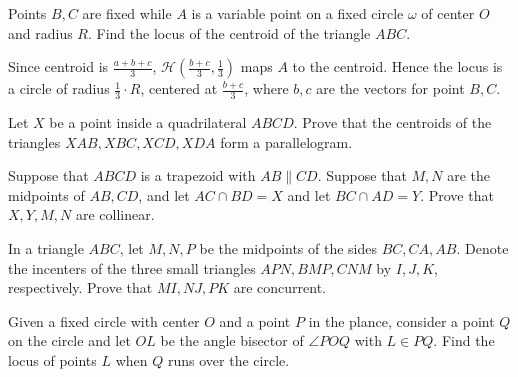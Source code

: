 \documentclass[11pt,twoside]{scrartcl}
\begin{document}
\begin{problem}
    Points $B, C$ are fixed while $A$ is a variable point on a fixed circle $\omega$ of center $O$ and radius $R$. Find the locus of the centroid of the triangle $ABC$.
    \begin{sketch}
        Since centroid is $\frac{a+b+c}{3}$, $\mathcal{H}(\frac{b+c}{3}, \frac{1}{3})$ maps $A$ to the centroid. Hence the locus is a circle of radius $\frac{1}{3}\cdot R$, centered at $\frac{b+c}{3}$, where $b, c$ are the vectors for point $B, C$.
    \end{sketch}
\end{problem}

\begin{problem}
    Let $X$ be a point inside a quadrilateral $ABCD$. Prove that the centroids of the triangles $XAB, XBC, XCD, XDA$ form a parallelogram.
    \begin{sketch}
        \TBD 
    \end{sketch}
\end{problem}

\begin{problem}
    Suppose that $ABCD$ is a trapezoid with $AB \parallel CD$. Suppose that $M, N$ are the midpoints of $AB,CD$, and let $AC \cap BD = X$ and let $BC \cap AD = Y$. Prove that $X, Y, M, N$ are collinear.
    \begin{sketch}
        \TBD 
    \end{sketch}
\end{problem}

\begin{problem}
    In a triangle $ABC$, let $M, N, P$ be the midpoints of the sides $BC, CA, AB$. Denote the incenters of the three small triangles $APN, BMP, CNM$ by $I, J, K$, respectively. Prove that $MI, NJ, PK$ are concurrent.
    \begin{sketch}
        \TBD 
    \end{sketch}
\end{problem}

\begin{problem}
    Given a fixed circle with center $O$ and a point $P$ in the plance, consider a point $Q$ on the circle and let $OL$ be the angle bisector of $ \angle POQ $ with $ L \in PQ $. Find the locus of points $L$ when $Q$ runs over the circle.
    \begin{sketch}
        \TBD 
    \end{sketch}
\end{problem}
\end{document}
